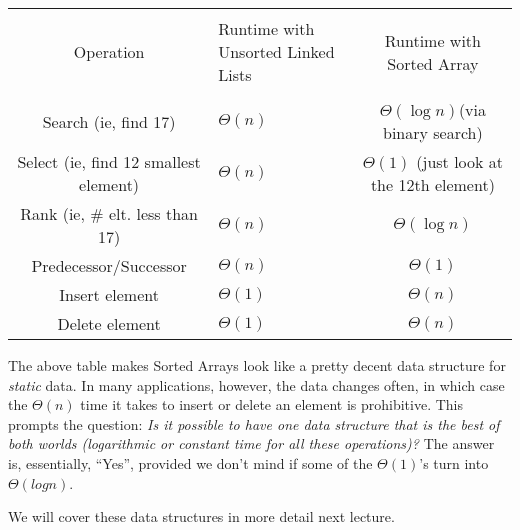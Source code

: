 \documentclass [12pt]{article}
\begin{document}
\begin{center}
\begin{tabular}{|c|p{2.4cm}|c|}
\hline \\
Operation & Runtime with Unsorted Linked Lists & Runtime with Sorted Array \\
\hline \\
Search (ie, find 17) & $\Theta(n)$ & $\Theta(\log n)$(via binary search) \\
Select (ie, find 12 smallest element) & $\Theta(n)$ & $\Theta(1)$ (just look at the 12th element) \\
Rank (ie, \# elt. less than 17) & $\Theta(n)$ & $\Theta(\log n)$\\
Predecessor/Successor & $\Theta(n)$ & $\Theta(1)$ \\
Insert element & $\Theta(1)$ & $\Theta(n)$ \\
Delete element & $\Theta(1)$ & $\Theta(n)$ \\
\hline
\end{tabular}
\end{center}


The above table makes Sorted Arrays look like a pretty decent data structure for \textit{static} data. In many applications, however, the data changes often, in which case the $\Theta(n)$ time it takes to insert or delete an element is prohibitive. This prompts the question: \textit{Is it possible to have one data structure that is the best of both worlds (logarithmic or constant time for all these operations)?} The answer is, essentially, ``Yes'', provided we don’t mind if some of the $\Theta(1)$’s turn into $\Theta(log n)$. 

We will cover these data structures in more detail next lecture.
\end{document}
